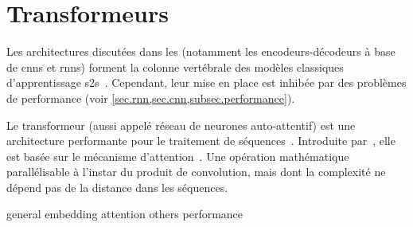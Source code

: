\section{Transformeurs}
\label{sec.transformers}

Les architectures discutées dans les 
(notamment les encodeurs-décodeurs à base de \glspl{cnn} et \glspl{rnn}) 
forment la colonne vertébrale des modèles classiques d'apprentissage \gls{s2s}~\cite{deep-nmt-survey}.
Cependant, leur mise en place est inhibée par des problèmes de performance 
(voir \cref{sec.rnn,sec.cnn,subsec.performance}).

Le transformeur (aussi appelé réseau de neurones auto-attentif) est une architecture performante pour le traitement de séquences~\cite{Shim_Sung_2022}.
Introduite par~\cite{attention}, elle est basée sur le mécanisme d'attention~\cite{Larochelle_Hinton_2010}.
Une opération mathématique parallélisable à l'instar du produit de convolution, 
mais dont la complexité ne dépend pas de la distance dans les séquences.



{general}
{embedding}
{attention}
{others}
{performance}